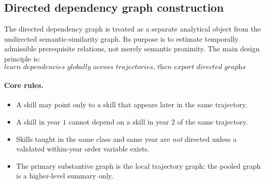 \subsection{Directed dependency graph construction}
\label{sec:directed_dependency_graph}

The directed dependency graph is treated as a separate analytical object from the undirected
semantic-similarity graph. Its purpose is to estimate temporally admissible prerequisite relations,
not merely semantic proximity. The main design principle is:
\[
\textit{learn dependencies globally across trajectories, then export directed graphs locally.}
\]

\paragraph{Core rules.}
\begin{itemize}
    \item A skill may point only to a skill that appears later in the same trajectory.
    \item A skill in year $1$ cannot depend on a skill in year $2$ of the same trajectory.
    \item Skills taught in the same class and same year are \emph{not} directed unless a validated
    within-year order variable exists.
    \item The primary substantive graph is the local trajectory graph; the pooled graph is a
    higher-level summary only.
\end{itemize}

